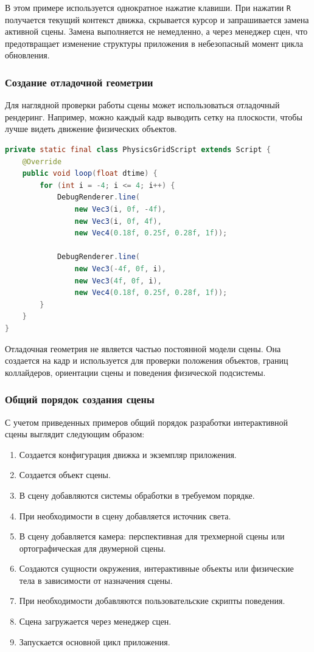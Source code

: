 В этом примере используется однократное нажатие клавиши. При нажатии \texttt{R} получается текущий контекст движка, скрывается курсор и запрашивается замена активной сцены. Замена выполняется не немедленно, а через менеджер сцен, что предотвращает изменение структуры приложения в небезопасный момент цикла обновления.

\subsubsection{Создание отладочной геометрии}

Для наглядной проверки работы сцены может использоваться отладочный рендеринг. Например, можно каждый кадр выводить сетку на плоскости, чтобы лучше видеть движение физических объектов.

\begin{lstlisting}[language=Java,caption={Пример вывода отладочной сетки}]
private static final class PhysicsGridScript extends Script {
    @Override
    public void loop(float dtime) {
        for (int i = -4; i <= 4; i++) {
            DebugRenderer.line(
                new Vec3(i, 0f, -4f),
                new Vec3(i, 0f, 4f),
                new Vec4(0.18f, 0.25f, 0.28f, 1f));

            DebugRenderer.line(
                new Vec3(-4f, 0f, i),
                new Vec3(4f, 0f, i),
                new Vec4(0.18f, 0.25f, 0.28f, 1f));
        }
    }
}
\end{lstlisting}

Отладочная геометрия не является частью постоянной модели сцены. Она создается на кадр и используется для проверки положения объектов, границ коллайдеров, ориентации сцены и поведения физической подсистемы.

\subsubsection{Общий порядок создания сцены}

С учетом приведенных примеров общий порядок разработки интерактивной сцены выглядит следующим образом:
\begin{enumerate}
\item Создается конфигурация движка и экземпляр приложения.
\item Создается объект сцены.
\item В сцену добавляются системы обработки в требуемом порядке.
\item При необходимости в сцену добавляется источник света.
\item В сцену добавляется камера: перспективная для трехмерной сцены или ортографическая для двумерной сцены.
\item Создаются сущности окружения, интерактивные объекты или физические тела в зависимости от назначения сцены.
\item При необходимости добавляются пользовательские скрипты поведения.
\item Сцена загружается через менеджер сцен.
\item Запускается основной цикл приложения.
\end{enumerate}

